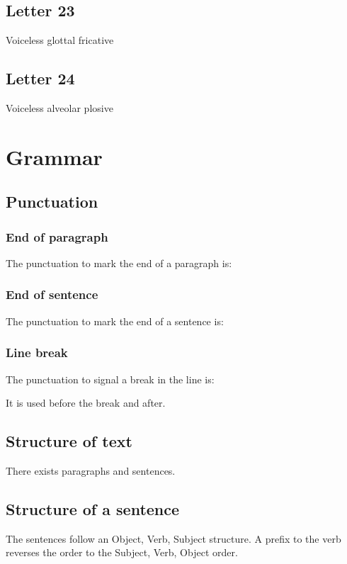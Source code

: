 \documentclass{book}
\newcommand{\display}[1]{\begin{center}\resizebox{2cm}{!}{\texttt{[image: \#1]}}\end{center}}
\begin{document}
\section{Letter 23}
Voiceless glottal fricative

\display{letters/consonants/23.JPG}


\section{Letter 24}
Voiceless alveolar plosive

\display{letters/consonants/24.JPG}



\chapter{Grammar}
\section{Punctuation}
\subsection{End of paragraph}
The punctuation to mark the end of a paragraph is:

\display{punctuation/paragraph-end.png}

\subsection{End of sentence}
The punctuation to mark the end of a sentence is:

\display{punctuation/sentence-end.png}

\subsection{Line break}
The punctuation to signal a break in the line is:

\display{punctuation/line-break.png}

It is used before the break and after.

\section{Structure of text}
There exists paragraphs and sentences.

\section{Structure of a sentence}
The sentences follow an Object, Verb, Subject structure.  A prefix to the verb reverses the order to the Subject, Verb, Object order.
\end{document}
